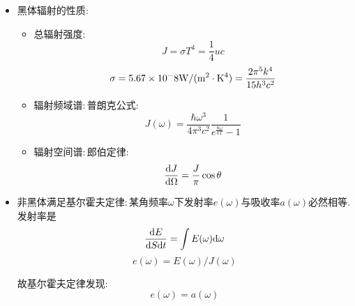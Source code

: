 \begin{itemize}
\item 黑体辐射的性质:
\begin{itemize}
\item 总辐射强度:
\[J=\sigma T^4=\frac{1}{4}uc\]
\[\sigma=5.67\times 10^-8{\rm W/(m^2\cdot K^4)}=\frac{2\pi^5 k^4}{15h^3c^2}\]

\item 辐射频域谱:\,普朗克公式:
\[J(\omega)=\frac{\hbar\omega^3}{4\pi^3c^2}\frac{1}{e^{\frac{\hbar\omega}{kT}}-1}\]

\item 辐射空间谱:\,郎伯定律:
\[\frac{\textrm{d} J}{\textrm{d}\Omega}=\frac{J}{\pi}\cos\theta\]
\end{itemize}

\item 非黑体满足基尔霍夫定律:\,某角频率$\omega$下发射率$e(\omega)$与吸收率$a(\omega)$必然相等.\,发射率是
\[\frac{\textrm{d} E}{\textrm{d} S\textrm{d} t}=\int E(\omega)\textrm{d} \omega\]
\[e(\omega)=E(\omega)/J(\omega)\]

故基尔霍夫定律发现:
\[e(\omega)=a(\omega)\]
\end{itemize}


